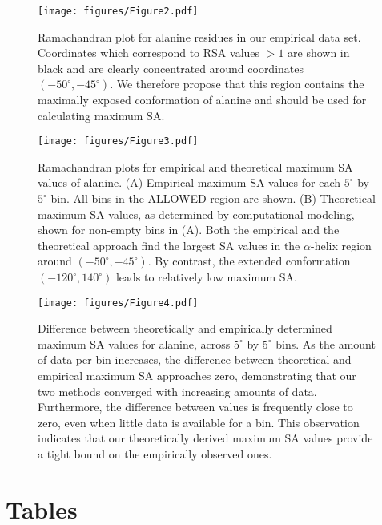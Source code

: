 \documentclass[11pt]{article}
\begin{document}
\begin{figure}[H]
\texttt{[image: figures/Figure2.pdf]}
\caption{\label{fig:RamaAla}Ramachandran plot for alanine residues in our empirical data set. Coordinates which correspond to RSA values $>1$ are shown in black and are clearly concentrated around coordinates $(-50^\circ,-45^\circ)$. We therefore propose that this region contains the maximally exposed conformation of alanine and should be used for calculating maximum SA.}
\end{figure}

\begin{figure}[H]
\texttt{[image: figures/Figure3.pdf]}
\caption{\label{fig:heatrama} Ramachandran plots for empirical and theoretical maximum SA values of alanine. (A) Empirical maximum SA values for each $5^\circ$ by $5^\circ$ bin. All bins in the ALLOWED region are shown. (B) Theoretical maximum SA values, as determined by computational modeling, shown for non-empty bins in (A). Both the empirical and the theoretical approach find the largest SA values in the $\alpha$-helix region around $(-50^\circ,-45^\circ)$. By contrast, the extended conformation $(-120^\circ, 140^\circ)$ leads to relatively low maximum SA.}
\end{figure}


\begin{figure}[H]
\texttt{[image: figures/Figure4.pdf]}
\caption{\label{fig:EvC} Difference between theoretically and empirically determined maximum SA values for alanine, across $5^\circ$ by $5^\circ$ bins. As the amount of data per bin increases, the difference between theoretical and empirical maximum SA approaches zero, demonstrating that our two methods converged with increasing amounts of data. Furthermore, the difference between values is frequently close to zero, even when little data is available for a bin. This observation indicates that our theoretically derived maximum SA values provide a tight bound on the empirically observed ones.}
\end{figure}

\cleardoublepage

\section*{Tables}
\end{document}
